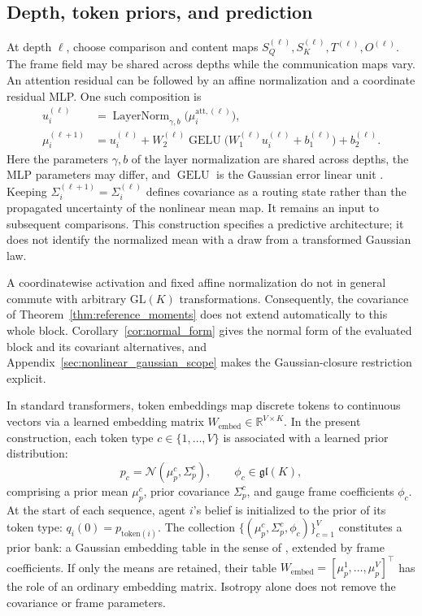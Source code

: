 \documentclass[twoside,11pt]{article}
\begin{document}
\subsection{Depth, token priors, and prediction}
\label{sec:depth_prediction}

At depth \(\ell\), choose comparison and content maps \(S_Q^{(\ell)},S_K^{(\ell)},T^{(\ell)},O^{(\ell)}\). The frame field may be shared across depths while the communication maps vary. An attention residual can be followed by an affine normalization and a coordinate residual MLP. One such composition is
\begin{align}
u_i^{(\ell)}&=\operatorname{LayerNorm}_{\gamma,b}
 \bigl(\mu_i^{\mathrm{att},(\ell)}\bigr),\\
\mu_i^{(\ell+1)}&=u_i^{(\ell)}
+W_2^{(\ell)}\operatorname{GELU}\bigl(W_1^{(\ell)}u_i^{(\ell)}+b_1^{(\ell)}\bigr)
+b_2^{(\ell)}.
\label{eq:relational_block_composition}
\end{align}
Here the parameters \(\gamma,b\) of the layer normalization \citep{ba2016layernorm} are shared across depths, the MLP parameters may differ, and \(\operatorname{GELU}\) is the Gaussian error linear unit \citep{hendrycks2016gaussian}. Keeping \(\Sigma_i^{(\ell+1)}=\Sigma_i^{(\ell)}\) defines covariance as a routing state rather than the propagated uncertainty of the nonlinear mean map. It remains an input to subsequent comparisons. This construction specifies a predictive architecture; it does not identify the normalized mean with a draw from a transformed Gaussian law.

A coordinatewise activation and fixed affine normalization do not in general commute with arbitrary \(\mathrm{GL}(K)\) transformations. Consequently, the covariance of Theorem~\ref{thm:reference_moments} does not extend automatically to this whole block. Corollary~\ref{cor:normal_form} gives the normal form of the evaluated block and its covariant alternatives, and Appendix~\ref{sec:nonlinear_gaussian_scope} makes the Gaussian-closure restriction explicit.


\label{sec:embeddings}

In standard transformers, token embeddings map discrete tokens to continuous vectors via a learned embedding matrix $W_{\text{embed}}\in\mathbb{R}^{V\times K}$. In the present construction, each token type $c \in \{1, \ldots, V\}$ is associated with a learned prior distribution:
\begin{equation}
p_c = \mathcal{N}(\mu_p^c, \Sigma_p^c), \qquad \phi_c \in \mathfrak{gl}(K),
\label{eq:prior_bank}
\end{equation}
comprising a prior mean $\mu_p^c$, prior covariance $\Sigma_p^c$, and gauge frame coefficients $\phi_c$. At the start of each sequence, agent $i$'s belief is initialized to the prior of its token type: $q_i(0) = p_{\mathrm{token}(i)}$. The collection $\{(\mu_p^c, \Sigma_p^c, \phi_c)\}_{c=1}^V$ constitutes a prior bank: a Gaussian embedding table in the sense of \citet{Vilnis2015Gaussian}, extended by frame coefficients. If only the means are retained, their table $W_{\mathrm{embed}}=[\mu_p^1,\ldots,\mu_p^V]^\top$ has the role of an ordinary embedding matrix. Isotropy alone does not remove the covariance or frame parameters.
\end{document}
